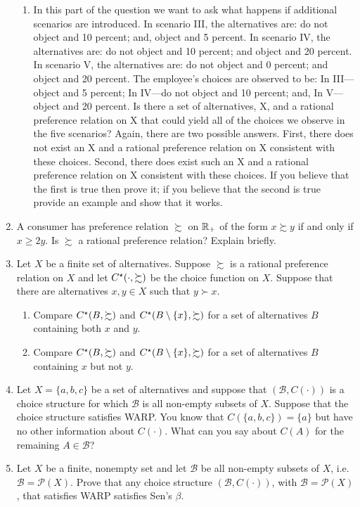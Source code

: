 \documentclass[12pt]{article}
\begin{document}
\begin{enumerate}
\begin{enumerate}
		\item In this part of the question we want to ask what happens if additional scenarios are introduced. In scenario III, the alternatives are: do not object and 10 percent; and, object and 5 percent. In scenario IV, the alternatives are: do not object and 10 percent; and object and 20 percent. In scenario V, the alternatives are: do not object and 0 percent; and object and 20 percent. The employee's choices are observed to be: In III---object and 5 percent; In IV---do not object and 10 percent; and, In V---object and 20 percent. Is there a set of alternatives, X, and a rational preference relation on X that could yield all of the choices we observe in the five scenarios? Again, there are two possible answers. First, there does not exist an X and a rational preference relation on X consistent with these choices. Second, there does exist such an X and a rational preference relation on X consistent with these choices. If you believe that the first is true then prove it; if you believe that the second is true provide an example and show that it works.
	\end{enumerate}
	\item A consumer has preference relation $\succsim$ on $\mathbb{R}_+$ of the form $x \succsim y$ if and only if $x \ge 2y$. Is $\succsim$ a rational preference relation? Explain briefly.
	\item Let $X$ be a finite set of alternatives. Suppose $\succsim$ is a rational preference relation on $X$ and let $C^\star(\cdot,\succsim)$ be the choice function on $X$. Suppose that there are alternatives $x,y \in X$ such that $y \succ x$.
	\begin{enumerate}
		\item Compare $C^\star(B,\succsim)$ and $C^\star(B \setminus \{x\},\succsim)$ for a set of alternatives $B$ containing both $x$ and $y$.
		\item Compare $C^\star(B,\succsim)$ and $C^\star(B \setminus \{x\},\succsim)$ for a set of alternatives $B$ containing $x$ but not $y$.
	\end{enumerate}
	\item Let $X = \{a,b,c\}$ be a set of alternatives and suppose that $(\mathcal{B},C(\cdot))$ is a choice structure for which $\mathcal{B}$ is all non-empty subsets of $X$. Suppose that the choice structure satisfies WARP. You know that $C(\{a,b,c\}) = \{a\}$ but have no other information about $C(\cdot)$. What can you say about $C(A)$ for the remaining $A \in \mathcal{B}$?
	\item Let $X$ be a finite, nonempty set and let $\mathcal{B}$ be all non-empty subsets of $X$, i.e. $\mathcal{B}=\mathcal{P}(X)$. Prove that any choice structure $(\mathcal{B},C(\cdot))$, with $\mathcal{B}=\mathcal{P}(X)$, that satisfies WARP satisfies Sen’s $\beta$.

\end{enumerate}
\end{document}
